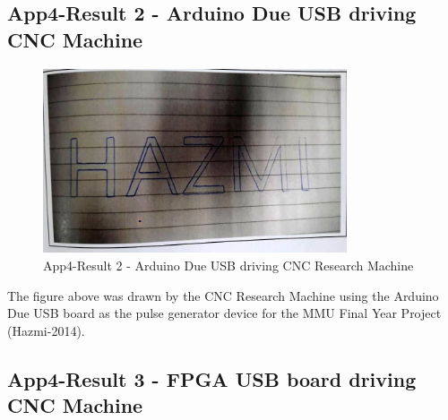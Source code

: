 \subsection{App4-Result 2 - Arduino Due USB driving CNC Machine}

\begin{figure}[htbp]
	\begin{center}
		\includegraphics[width=0.80\textwidth]{./07-images/img-Ch4App/Hazmi-Arduino-Due-CNC-Driven.jpg}
		\caption{App4-Result 2 - Arduino Due USB driving CNC Research Machine}
		\label{fig:App4-Hazmi -  CNC Research Machine Arduino Due drawing HAZMI}
	\end{center}
\end{figure}
The figure above was drawn by the CNC Research Machine using the Arduino Due USB board as the pulse generator device for the MMU Final Year Project (Hazmi-2014).

\pagebreak
\subsection{App4-Result 3 - FPGA USB board driving CNC Machine}

